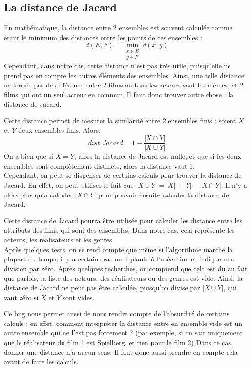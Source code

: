 \documentclass{report}
\begin{document}
\subsection{La distance de Jacard}
En mathématique, la distance entre 2 ensembles est souvent calculée comme étant le minimum des distances entre les points de ces ensembles :
\[d(E,F)=\min_{\substack{x\in E \\ y\in F}} d(x,y)\]
Cependant, dans notre cas, cette distance n'est pas très utile, puisqu'elle ne prend pas en compte les autres éléments des ensembles. Ainsi, une telle distance ne ferrais pas de différence entre 2 films où tous les acteurs sont les mêmes, et 2 films qui ont  un seul acteur en commun. Il faut donc trouver autre chose : la distance de Jacard.\par
Cette distance permet de mesurer la similarité entre 2 ensembles finis : soient $X$ et $Y$ deux ensembles finis. Alors,
\[dist\_Jacard=1-\frac{|X \cap Y|}{|X \cup Y|}\]
On a bien que si \(X=Y\), alors la distance de Jacard est nulle, et que si les deux ensembles sont complètement distincts, alors la distance vaut 1.\\
Cependant, on peut se dispenser de certains calculs pour trouver la distance de Jacard. En effet, on peut utiliser le fait que \(|X \cup Y|=|X|+|Y|-|X \cap Y|\). Il n'y a alors plus qu'a calculer \(|X \cap Y|\) pour pouvoir ensuite calculer la distance de Jacard.\par
Cette distance de Jacard pourra être utilisée pour calculer les distance entre les attributs des films qui sont des ensembles. Dans notre cas, cela représente les acteurs, les réalisateurs et les genres.\\
Après quelques tests, on se rend compte que même si l'algorithme marche la plupart du temps, il y a certains cas ou il plante à l'exécution et indique une division par zéro. Après quelques recherches, on comprend que cela est du au fait que parfois, la liste des acteurs, des réalisateurs ou des genres est vide. Ainsi, la distance de Jacard ne peut pas être calculée, puisqu'on divise par \(|X \cup Y|\), qui vaut zéro si $X$ et $Y$ sont vides.\par
Ce bug nous permet aussi de nous rendre compte de l'absurdité de certains calculs : en effet, comment interpréter la distance entre en ensemble vide est un autre ensemble qui ne l'est pas forcement ? (par exemple, si on sait uniquement que le réalisateur du film 1 est Spielberg, et rien pour le film 2) Dans ce cas, donner une distance n'a aucun sens. Il faut donc aussi prendre en compte cela avant de faire les calculs.\par
\end{document}

